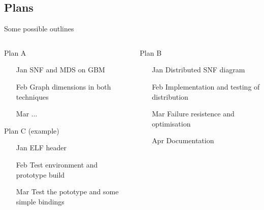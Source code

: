 \documentclass[hyperref={colorlinks=true}]{beamer}
\begin{document}
\subsection{Plans}
\begin{frame}{Some possible outlines}
  \begin{columns}[T]
  \begin{column}{.5\textwidth}
    \begin{block}{Plan A}
      \begin{itemize}
       \item[Jan] SNF and MDS on GBM
       \item[Feb] Graph dimensions in both techniques
       \item[Mar] ...
      \end{itemize}
    \end{block}
    \begin{block}{Plan C (example)}
      \begin{itemize}
       \item[Jan] ELF header
       \item[Feb] Test environment and prototype build
       \item[Mar] Test the pototype and some simple bindings
      \end{itemize}
    \end{block}
  \end{column}
  \begin{column}{.5\textwidth}
    \begin{block}{Plan B}
      \begin{itemize}
       \item[Jan] Distributed SNF diagram
       \item[Feb] Implementation and testing of distribution
       \item[Mar] Failure resistence and optimisation
       \item[Apr] Documentation
      \end{itemize}
    \end{block}
  \end{column}
  \end{columns}
\end{frame}
\end{document}
